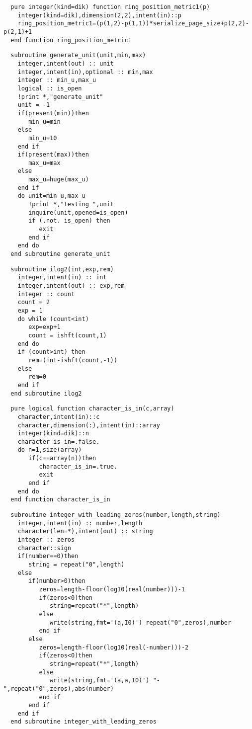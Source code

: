 \begin{Verbatim}
  pure integer(kind=dik) function ring_position_metric1(p)
    integer(kind=dik),dimension(2,2),intent(in)::p
    ring_position_metric1=(p(1,2)-p(1,1))*serialize_page_size+p(2,2)-p(2,1)+1
  end function ring_position_metric1
\end{Verbatim}

\begin{Verbatim}
  subroutine generate_unit(unit,min,max)
    integer,intent(out) :: unit
    integer,intent(in),optional :: min,max
    integer :: min_u,max_u
    logical :: is_open
    !print *,"generate_unit"
    unit = -1
    if(present(min))then
       min_u=min
    else
       min_u=10
    end if
    if(present(max))then
       max_u=max
    else
       max_u=huge(max_u)
    end if
    do unit=min_u,max_u
       !print *,"testing ",unit
       inquire(unit,opened=is_open)
       if (.not. is_open) then
          exit
       end if
    end do
  end subroutine generate_unit
\end{Verbatim}
  
\begin{Verbatim}
  subroutine ilog2(int,exp,rem)
    integer,intent(in) :: int
    integer,intent(out) :: exp,rem
    integer :: count
    count = 2
    exp = 1
    do while (count<int)
       exp=exp+1
       count = ishft(count,1)
    end do
    if (count>int) then
       rem=(int-ishft(count,-1))
    else
       rem=0
    end if    
  end subroutine ilog2
\end{Verbatim}

\begin{Verbatim}
  pure logical function character_is_in(c,array)
    character,intent(in)::c
    character,dimension(:),intent(in)::array
    integer(kind=dik)::n
    character_is_in=.false.
    do n=1,size(array)
       if(c==array(n))then
          character_is_in=.true.
          exit
       end if
    end do
  end function character_is_in
\end{Verbatim}

\begin{Verbatim}
  subroutine integer_with_leading_zeros(number,length,string)
    integer,intent(in) :: number,length
    character(len=*),intent(out) :: string
    integer :: zeros
    character::sign
    if(number==0)then
       string = repeat("0",length)
    else
       if(number>0)then
          zeros=length-floor(log10(real(number)))-1
          if(zeros<0)then
             string=repeat("*",length)
          else
             write(string,fmt='(a,I0)') repeat("0",zeros),number
          end if
       else
          zeros=length-floor(log10(real(-number)))-2
          if(zeros<0)then
             string=repeat("*",length)
          else
             write(string,fmt='(a,a,I0)') "-",repeat("0",zeros),abs(number)
          end if
       end if
    end if
  end subroutine integer_with_leading_zeros
\end{Verbatim}
